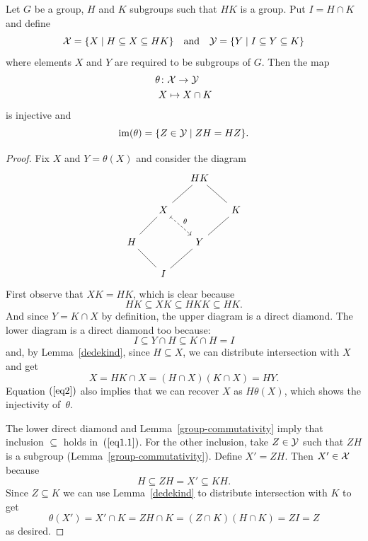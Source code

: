 \begin{cor}
    Let $G$ be a group, $H$ and $K$ subgroups such that $HK$ is a group. Put $I=H\cap K$ and define
    $$
        {\cal X} = \{X \mid H\subseteq X\subseteq HK\}
        \quad\text{and}\quad
        {\cal Y} = \{Y\mid I\subseteq Y\subseteq K\}
    $$
    where elements $X$ and $Y$ are required to be subgroups of\/ $G$.
    Then the map
    \begin{align*}
        \theta\colon&{\cal X}\to{\cal Y}\\
        X&\mapsto X\cap K
    \end{align*}
    is injective and
    \begin{equation}\label{eq1.1}
        \operatorname{im}(\theta) = \{Z \in {\cal Y} \mid ZH=HZ\}.
    \end{equation}
\end{cor}

\begin{proof} Fix $X$ and $Y=\theta(X)$ and consider the diagram
$$
    \begin{tikzcd}[column sep=0.5cm]
            &&HK
                \arrow[rd,no head]
                \arrow[ld,no head]\\
            &X
                \arrow[ld,no head]
                \arrow[rd,"\theta",dashed,maps to]
            &&K
                \arrow[ld,no head]\\
        H
                \arrow[rd,no head]
            &&Y
                \arrow[ld,no head]\\
            &I
\end{tikzcd}
$$
First observe that $XK=HK$, which is clear because
$$
    HK\subseteq XK \subseteq HKK\subseteq HK.
$$
And since $Y=K\cap X$ by definition, the upper diagram is a direct diamond. The lower diagram is a direct diamond too because:
$$
    I \subseteq Y\cap H\subseteq K\cap H= I
$$
and, by Lemma~\ref{dedekind}, since $H\subseteq X$, we can distribute intersection with $X$ and get
\begin{equation}\label{eq2}
    X = HK\cap X = (H\cap X)(K\cap X) = HY.
\end{equation}
Equation $(\ref{eq2})$ also implies that we can recover $X$ as $H\theta(X)$, which shows the injectivity of~$\theta$.

The lower direct diamond and Lemma~\ref{group-commutativity} imply that inclusion $\subseteq$ holds in~$(\ref{eq1.1})$. For the other inclusion, take $Z\in{\cal Y}$ such that $ZH$ is a subgroup (Lemma~\ref{group-commutativity}). Define $X'=ZH$. Then $X'\in{\cal X}$ because
$$
    H \subseteq ZH = X' \subseteq KH.
$$
Since $Z\subseteq K$ we can use Lemma~\ref{dedekind} to distribute intersection with $K$ to get
$$
    \theta(X')= X'\cap K = ZH\cap K = (Z\cap K)(H\cap K) = ZI = Z
$$
as desired.  \end{proof}

